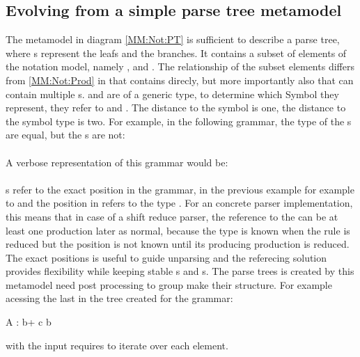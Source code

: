 \subsection{Evolving from a simple parse tree metamodel}The metamodel in diagram \ref{MM:Not:PT} is sufficient to describe a parse tree, where s represent the leafs and  the branches. It contains a subset of elements of the notation model, namely ,  and . The relationship of the subset elements differs from \ref{MM:Not:Prod} in that  contains  direcly, but more importantly also that  can contain multiple s.  and  are of a generic type, to determine which Symbol they represent, they refer to  and . The distance to the symbol is one, the distance to the symbol type is two. 
For example, in the following grammar, the type of the s are equal, but the s are not:\\
 \\
A verbose representation of this grammar would be: \\
 \\
s refer to the exact position in the grammar, in the previous example for example to  and the position in refers to the type . For an concrete parser implementation, this means that in case of a shift reduce parser, the reference to the  can be at least one production later as normal, because the type is known when the rule is reduced but the position is not known until its producing production is reduced. The exact positions is useful to guide unparsing and the referecing solution provides flexibility while keeping stable s and s. The parse trees is created by this metamodel need post processing to group make their structure. For example acessing the last  in the tree created for the grammar:\\
\begin{xtxt}
A : b+ c b 
\end{xtxt}
with the input  requires to iterate over each element. 

